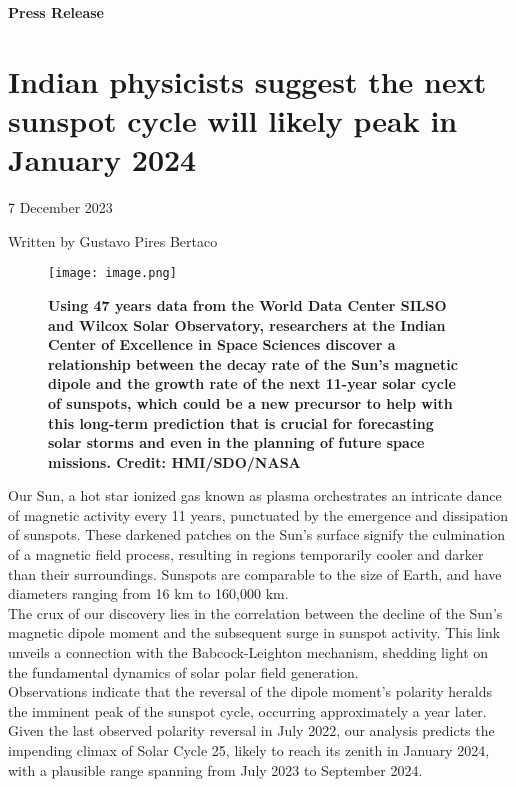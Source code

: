 \documentclass{article}
\begin{document}
\begin{flushleft}
    \textbf{Press Release}
\end{flushleft}

\section*{\Huge Indian physicists suggest the next sunspot cycle will likely peak in January 2024}

\begin{flushleft}
    7 December 2023
\end{flushleft}
\begin{flushleft}
    Written by Gustavo Pires Bertaco
\end{flushleft}

\begin{figure}[h]
    \centering
    \texttt{[image: image.png]}
    \captionsetup{justification=justified} 
    \caption*{\textbf{ Using 47 years data from the World Data Center SILSO and Wilcox Solar Observatory, researchers at the Indian Center of Excellence in Space Sciences discover a relationship between the decay rate of the Sun's magnetic dipole and the growth rate of the next 11-year solar cycle of sunspots, which could be a new precursor to help with this long-term prediction that is crucial for forecasting solar storms and even in the planning of future space missions. Credit: HMI/SDO/NASA}}
\end{figure}

Our Sun, a hot star ionized gas known as plasma orchestrates an intricate dance of magnetic activity every 11 years, punctuated by the emergence and dissipation of sunspots. These darkened patches on the Sun's surface signify the culmination of a magnetic field process, resulting in regions temporarily cooler and darker than their surroundings. Sunspots are comparable to the size of Earth, and have diameters ranging from 16 km to 160,000 km.\\

The crux of our discovery lies in the correlation between the decline of the Sun's magnetic dipole moment and the subsequent surge in sunspot activity. This link unveils a connection with the Babcock-Leighton mechanism, shedding light on the fundamental dynamics of solar polar field generation.\\

Observations indicate that the reversal of the dipole moment's polarity heralds the imminent peak of the sunspot cycle, occurring approximately a year later. Given the last observed polarity reversal in July 2022, our analysis predicts the impending climax of Solar Cycle 25, likely to reach its zenith in January 2024, with a plausible range spanning from July 2023 to September 2024.\\
\end{document}

